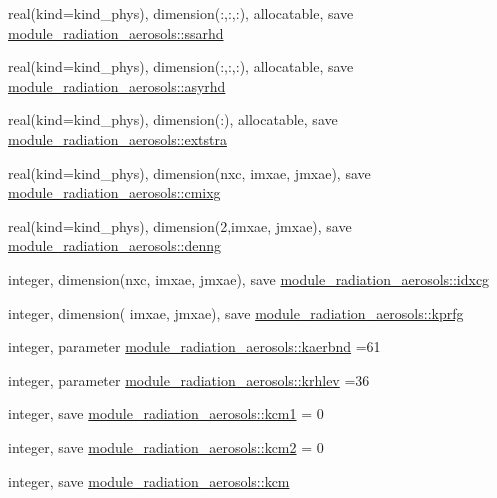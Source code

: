\begin{DoxyCompactItemize}
\item 
real(kind=kind\+\_\+phys), dimension(\+:,\+:,\+:), allocatable, save \hyperlink{group__module__radiation__aerosols_gac0714d386ee3dc2ca7f6692905566274}{module\+\_\+radiation\+\_\+aerosols\+::ssarhd}
\item 
real(kind=kind\+\_\+phys), dimension(\+:,\+:,\+:), allocatable, save \hyperlink{group__module__radiation__aerosols_ga090d37e62ba333db64e28bf89e89a08d}{module\+\_\+radiation\+\_\+aerosols\+::asyrhd}
\item 
real(kind=kind\+\_\+phys), dimension(\+:), allocatable, save \hyperlink{group__module__radiation__aerosols_gac0c59f22f472671cd86221cc1ed46c60}{module\+\_\+radiation\+\_\+aerosols\+::extstra}
\item 
real(kind=kind\+\_\+phys), dimension(nxc, imxae, jmxae), save \hyperlink{group__module__radiation__aerosols_ga358c83599fb321a59c958e54d9f284d9}{module\+\_\+radiation\+\_\+aerosols\+::cmixg}
\item 
real(kind=kind\+\_\+phys), dimension(2,imxae, jmxae), save \hyperlink{group__module__radiation__aerosols_ga0ccc698bc870cb6ccbc1c2b64a3f45f6}{module\+\_\+radiation\+\_\+aerosols\+::denng}
\item 
integer, dimension(nxc, imxae, jmxae), save \hyperlink{group__module__radiation__aerosols_ga4cb38abaf6ece5a0ed717edd6f6b4078}{module\+\_\+radiation\+\_\+aerosols\+::idxcg}
\item 
integer, dimension(     imxae, jmxae), save \hyperlink{group__module__radiation__aerosols_ga28df10ba381278cc7474bea0bfdaa870}{module\+\_\+radiation\+\_\+aerosols\+::kprfg}
\item 
integer, parameter \hyperlink{group__module__radiation__aerosols_gad345c77fc29d8b02de34990162645a66}{module\+\_\+radiation\+\_\+aerosols\+::kaerbnd} =61
\item 
integer, parameter \hyperlink{group__module__radiation__aerosols_ga33f2d4489a1730a27cbdc2e2add0f977}{module\+\_\+radiation\+\_\+aerosols\+::krhlev} =36
\item 
integer, save \hyperlink{group__module__radiation__aerosols_ga92b09dd26cc321af3b5da0b1c310a588}{module\+\_\+radiation\+\_\+aerosols\+::kcm1} = 0
\item 
integer, save \hyperlink{group__module__radiation__aerosols_gab2be28697a95bcec8d5cd8de7ebd4328}{module\+\_\+radiation\+\_\+aerosols\+::kcm2} = 0
\item 
integer, save \hyperlink{group__module__radiation__aerosols_ga4816bc93b826ff2fad9ff0805ea39fd5}{module\+\_\+radiation\+\_\+aerosols\+::kcm}

\end{DoxyCompactItemize}
